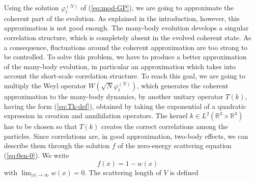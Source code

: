 \documentclass[11pt,a4paper]{article}
\newcommand{\bR}{{\mathbb R}}
\begin{document}
\medskip

Using the solution $\varphi_t^{(N)}$ of (\ref{eq:mod-GP}), we are going to approximate the coherent part of the evolution. As explained in the introduction, however, this approximation is not good enough. The many-body evolution develops a singular correlation structure, which is completely absent in the evolved coherent state. As a consequence, fluctuations around the coherent approximation are too strong to be controlled. To solve this problem, we have to produce a better approximation of the many-body evolution, in particular an approximation which takes into account the short-scale correlation structure. To reach this goal, we are going to multiply the Weyl operator $W(\sqrt{N} \varphi_t^{(N)})$, which generates the coherent approximation to the many-body dynamics, by another unitary operator $T(k)$, having the form (\ref{eq:Tk-def}), obtained by taking the exponential of a quadratic expression in creation and annihilation operators. The kernel $k \in L^2 (\bR^3 \times \bR^3)$ has to be chosen so that $T(k)$ creates the correct correlations among the particles. Since correlations are, in good approximation, two-body effects, we can describe them through the solution $f$ of the zero-energy scattering equation (\ref{eq:0en-0}). We write 
%
\begin{equation}\label{eq:wdef}
  f (x) = 1 - w (x)
\end{equation}
with $\lim_{|x|\to\infty} w(x) = 0$. The scattering length of $V$ is defined
\end{document}
